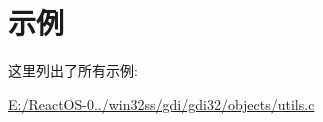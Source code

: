 \section{示例}
这里列出了所有示例\+:\begin{DoxyCompactItemize}
\item 
\hyperlink{_e_1_2_react_o_s-0_84_86_2win32ss_2gdi_2gdi32_2objects_2utils_8c-example}{E\+:/\+React\+O\+S-\/0../win32ss/gdi/gdi32/objects/utils.\+c}
\end{DoxyCompactItemize}
